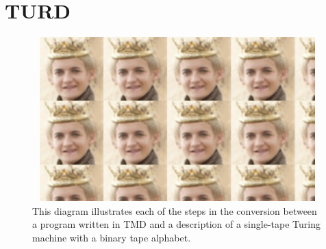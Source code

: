 \documentclass{report}
\begin{document}
\section{TURD} 

\begin{figure} 
\begin{center} 
\includegraphics[height=2.5in,width=5in,angle=0]{many_joffrey_heads.png} 
\caption{This diagram illustrates each of the steps in the conversion between a program written in TMD and a description of a single-tape Turing machine with a binary tape alphabet.\label{fig:process}} 
\end{center} 
\end{figure}  
\end{document}
